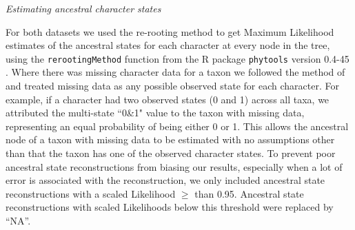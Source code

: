 \documentclass[12pt,letterpaper]{article}
\renewcommand{\subsection}[1]{%
\bigskip
\begin{center}
\begin{large}
\normalfont\itshape #1
\end{large}
\end{center}}
\begin{document}
\subsection{Estimating ancestral character states}
For both datasets we used the re-rooting method \citep{Yang01121995} %
to get Maximum Likelihood estimates of the ancestral states for each character at every node in the tree, using the \texttt{rerootingMethod} function from the R package \texttt{phytools} version 0.4-45 \citep{phytools,R}.
Where there was missing character data for a taxon we followed the method of \cite{Claddis} and treated missing data as any possible observed state for each character.
For example, if a character had two observed states (0 and 1) across all taxa, we attributed the multi-state ``0\&1" value to the taxon with missing data, representing an equal probability of being either 0 or 1.
This allows the ancestral node of a taxon with missing data to be estimated with no assumptions other than that the taxon has one of the observed character states.
To %
prevent poor %
ancestral state reconstructions from biasing our results, especially when a lot of error is associated with the reconstruction, we only included ancestral state reconstructions with a scaled Likelihood $\geq$ than 0.95.
Ancestral state reconstructions with scaled Likelihoods below this threshold were replaced by ``NA''.
\end{document}
